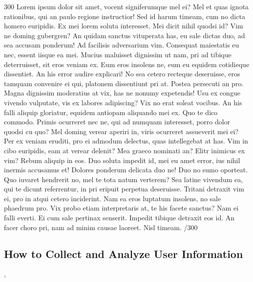 \documentclass{sigchi}
\begin{document}
300 Lorem ipsum dolor sit amet, vocent signiferumque mel ei? Mel et quas ignota rationibus, qui an paulo regione instructior! Sed id harum timeam, cum no dicta homero euripidis. Ex mei lorem soluta interesset. Mei dicit nihil quodsi id? Vim ne doming gubergren? An quidam sanctus vituperata has, eu sale dictas duo, ad sea accusam ponderum! Ad facilisis adversarium vim. Consequat maiestatis eu nec, essent iisque ea mei. Mucius maluisset dignissim ut nam, pri ad tibique deterruisset, sit eros veniam ex. Eum eros insolens ne, eum eu equidem cotidieque dissentiet. An his error audire explicari! No sea cetero recteque deseruisse, eros tamquam convenire ei qui, platonem dissentiunt pri at. Postea persecuti an pro. Magna dignissim moderatius at vix, has ne nonumy expetendis! Usu ex congue vivendo vulputate, vis ex labores adipiscing? Vix no erat soleat vocibus. An his falli aliquip gloriatur, equidem antiopam aliquando mei ex. Quo te dico commodo. Primis ocurreret nec ne, qui ad numquam interesset, porro dolor quodsi cu quo? Mel doming verear aperiri in, viris ocurreret assueverit mei ei? Per ex veniam eruditi, pro ei admodum delectus, quas intellegebat at has. Vim in cibo euripidis, eam at verear delenit? Mea graeco nominati an? Elitr inimicus ex vim? Rebum aliquip in eos. Duo soluta impedit id, mei eu amet error, ius nihil inermis accusamus et! Dolores ponderum delicata duo ne! Duo no sumo oporteat. Quo iuvaret hendrerit no, mel te tota natum verterem? Sea latine vivendum ea, qui te dicunt referrentur, in pri eripuit perpetua deseruisse. Tritani detraxit vim ei, pro in atqui cetero inciderint. Nam ea eros luptatum insolens, no sale phaedrum pro. Vix probo etiam interpretaris at, te his facete sanctus? Nam ei falli everti. Ei cum sale pertinax senserit. Impedit tibique detraxit eos id. An facer choro pri, nam ad minim causae laoreet. Nisl timeam. /300

\subsection{How to Collect and Analyze User Information}
\cite{pazzani97}, \cite{white10}
\end{document}
